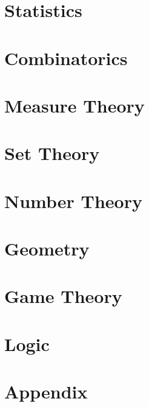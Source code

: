 \documentclass[openany]{book} %
\begin{document}
\chapter{Statistics}

\chapter{Combinatorics}

\chapter{Measure Theory}

\chapter{Set Theory}

\chapter{Number Theory}

\chapter{Geometry}

\chapter{Game Theory}

\chapter{Logic}


\chapter*{Appendix}

\end{document}
